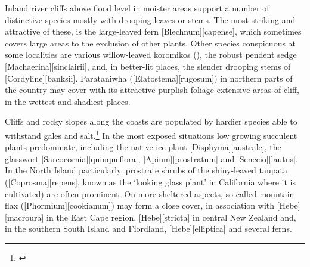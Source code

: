 Inland river cliffs above flood level in moister areas support a number of distinctive species mostly with drooping leaves or stems.
The most striking and attractive of these, is the large-leaved fern [Blechnum][capense], which sometimes covers large areas to the exclusion of other plants.
Other species conspicuous at some localities are various willow-leaved koromikos (), the robust pendent sedge [Machaerina][sinclairii], and, in better-lit places, the slender drooping stems of [Cordyline][banksii].
Parataniwha ([Elatostema][rugosum]) in northern parts of the country may cover with its attractive purplish foliage extensive areas of cliff, in the wettest and shadiest places.

Cliffs and rocky slopes along the coasts are populated by hardier species able to withstand gales and salt.\footnote{\cite{moore1963plants}}
In the most exposed situations low growing succulent plants predominate, including the native ice plant [Disphyma][australe], the glasswort [Sarcocornia][quinqueflora], [Apium][prostratum] and [Senecio][lautus].
In the North Island particularly, prostrate shrubs of the shiny-leaved taupata ([Coprosma][repens], known as the `looking glass plant' in California where it is cultivated) are often prominent.
On more sheltered aspects, so-called mountain flax ([Phormium][cookianum]) may form a close cover, in association with [Hebe][macroura] in the East Cape region, [Hebe][stricta] in central New Zealand and, in the southern South Island and Fiordland, [Hebe][elliptica] and several ferns.

